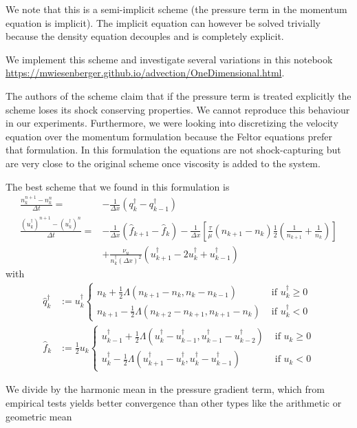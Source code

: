 We note that this is a semi-implicit scheme (the pressure term in the momentum equation is implicit). The implicit equation can however be solved trivially because
the density equation decouples and is completely explicit.

We implement this scheme and investigate several variations in this notebook
\url{https://mwiesenberger.github.io/advection/OneDimensional.html}.

The authors of the scheme claim that if the pressure term is treated explicitly the
scheme loses its shock conserving properties. We cannot reproduce this behaviour
in our experiments. Furthermore, we were looking into discretizing the
velocity equation over the momentum formulation because the Feltor equations
prefer that formulation. In this formulation the equations are not shock-capturing
but are very close to the original scheme once viscosity is added to the system.

The best scheme that we found in this formulation is
\begin{align}
    \frac{n_k^{n+1} - n_k^n}{\Delta t} = &- \frac{1}{\Delta x}(q^\dagger_k  - q^\dagger_{k-1}) \\
    \frac{(u_k^\dagger)^{n+1}-(u_k^\dagger)^{n}}{\Delta t} = &- \frac{1}{\Delta
    x} \left( \hat f_{k+1} -\hat f_k\right) - \frac{1}{\Delta x}\left[
        \frac{\tau}{\mu} \left(n_{k+1} - n_k\right) \frac{1}{2}\left(\frac{1}{n_{k+1}}
    +\frac{1}{n_k}\right)\right]
    \nonumber\\
    &+ \frac{\nu_u}{n^\dagger_k (\Delta x)^2}
    \left(u^\dagger_{k+1} - 2 u^\dagger_k + u^\dagger_{k-1}\right)
\end{align}
with
\begin{align}
    \hat q^\dagger_k &:= u^\dagger_k \begin{cases}
        n_k     + \frac{1}{2}\Lambda( n_{k+1}-n_k    , n_k - n_{k-1})&\text{ if } u^\dagger_k \geq 0 \\
        n_{k+1} - \frac{1}{2}\Lambda( n_{k+2}-n_{k+1}, n_{k+1} - n_k)&\text{ if } u^\dagger_k < 0
    \end{cases}
    \\
    \hat f_k &:= \frac{1}{2}u_k \begin{cases}
        u^\dagger_{k-1} + \frac{1}{2}\Lambda( u^\dagger_{k}-u^\dagger_{k-1}, u^\dagger_{k-1} - u^\dagger_{k-2})&\text{ if } u_k \geq 0 \\
        u^\dagger_k     - \frac{1}{2}\Lambda( u^\dagger_{k+1}-u^\dagger_k    , u^\dagger_k - u^\dagger_{k-1})&\text{ if } u_k < 0
    \end{cases}
\end{align}
\begin{tcolorbox}[title=Note]
    We divide by the harmonic mean in the pressure gradient term, which from empirical tests
    yields better convergence than other types like the arithmetic
    or geometric mean
\end{tcolorbox}
